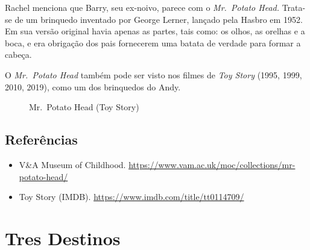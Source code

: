 \saveparinfos
\noindent
\begin{minipage}[c]{0.5\textwidth}\useparinfo

Rachel menciona que Barry, seu ex-noivo, parece com o \emph{Mr.~Potato
Head.} Trata-se de um brinquedo inventado por George Lerner, lançado
pela Hasbro em 1952. Em sua versão original havia apenas as partes, tais
como: os olhos, as orelhas e a boca, e era obrigação dos pais fornecerem
uma batata de verdade para formar a cabeça.

O \emph{Mr.~Potato Head} também pode ser visto nos filmes de \emph{Toy
Story} (1995, 1999, 2010, 2019), como um dos brinquedos do Andy.

\end{minipage}\hfill
\begin{minipage}[c]{0.45\textwidth}

\begin{figure}
  \centering
    \caption{Mr. Potato Head (Toy Story)\label{fig:mr-potato-head-toy-story}}
\end{figure}

\end{minipage}

\hypertarget{referuxeancias}{%
\subsection{Referências}\label{referuxeancias}}

\begin{itemize}
\tightlist
\item
  \sloppy V&A Museum of Childhood. \url{https://www.vam.ac.uk/moc/collections/mr-potato-head/}
\item
  \sloppy Toy Story (IMDB). \url{https://www.imdb.com/title/tt0114709/}
\end{itemize}

\hypertarget{tres-destinos}{%
\section{Tres Destinos}\label{tres-destinos}}

